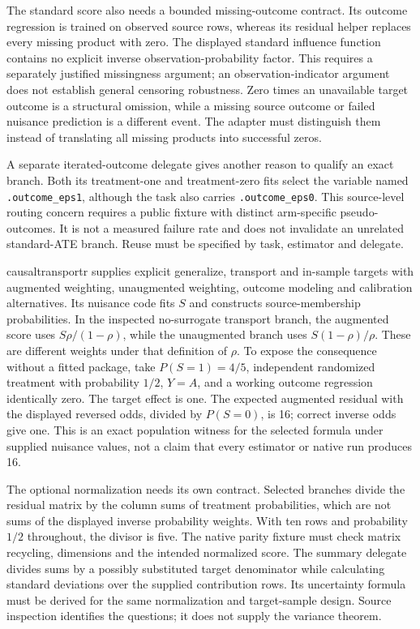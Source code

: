 The standard score also needs a bounded missing-outcome contract. Its outcome regression is trained on observed source rows, whereas its residual helper replaces every missing product with zero. The displayed standard influence function contains no explicit inverse observation-probability factor. This requires a separately justified missingness argument; an observation-indicator argument does not establish general censoring robustness. Zero times an unavailable target outcome is a structural omission, while a missing source outcome or failed nuisance prediction is a different event. The adapter must distinguish them instead of translating all missing products into successful zeros.\citep{exec25_rtm_transportr}

A separate iterated-outcome delegate gives another reason to qualify an exact branch. Both its treatment-one and treatment-zero fits select the variable named \texttt{.outcome\_eps1}, although the task also carries \texttt{.outcome\_eps0}. This source-level routing concern requires a public fixture with distinct arm-specific pseudo-outcomes. It is not a measured failure rate and does not invalidate an unrelated standard-ATE branch. Reuse must be specified by task, estimator and delegate.\citep{exec25_rtm_transportr}

causaltransportr supplies explicit generalize, transport and in-sample targets with augmented weighting, unaugmented weighting, outcome modeling and calibration alternatives. Its nuisance code fits $S$ and constructs source-membership probabilities. In the inspected no-surrogate transport branch, the augmented score uses $S\rho/(1-\rho)$, while the unaugmented branch uses $S(1-\rho)/\rho$. These are different weights under that definition of $\rho$. To expose the consequence without a fitted package, take $P(S=1)=4/5$, independent randomized treatment with probability $1/2$, $Y=A$, and a working outcome regression identically zero. The target effect is one. The expected augmented residual with the displayed reversed odds, divided by $P(S=0)$, is 16; correct inverse odds give one. This is an exact population witness for the selected formula under supplied nuisance values, not a claim that every estimator or native run produces 16.\citep{exec25_rtm_causaltransportr,exec25_rtm_choice}

The optional normalization needs its own contract. Selected branches divide the residual matrix by the column sums of treatment probabilities, which are not sums of the displayed inverse probability weights. With ten rows and probability $1/2$ throughout, the divisor is five. The native parity fixture must check matrix recycling, dimensions and the intended normalized score. The summary delegate divides sums by a possibly substituted target denominator while calculating standard deviations over the supplied contribution rows. Its uncertainty formula must be derived for the same normalization and target-sample design. Source inspection identifies the questions; it does not supply the variance theorem.\citep{exec25_rtm_causaltransportr,exec25_rtm_choice}

